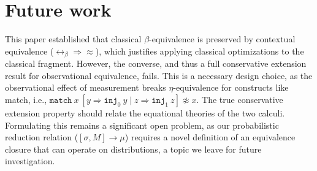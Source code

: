\section{Future work}
This paper established that classical $\beta$-equivalence is preserved by contextual equivalence ($\leftrightarrow_\beta \Rightarrow \approx$), which justifies applying classical optimizations to the classical fragment.
However, the converse, and thus a full conservative extension result for observational equivalence, fails.
This is a necessary design choice, as the observational effect of measurement breaks $\eta$-equivalence for constructs like match, i.e., $\texttt{match}\ x\ [y\Rightarrow \texttt{inj}_0\ y\mid z\Rightarrow \texttt{inj}_1\ z] \not\approx x$.
The true conservative extension property should relate the equational theories of the two calculi.
Formulating this remains a significant open problem, as our probabilistic reduction relation ($[\sigma, M] \longrightarrow \mu$) requires a novel definition of an equivalence closure that can operate on distributions, a topic we leave for future investigation.



